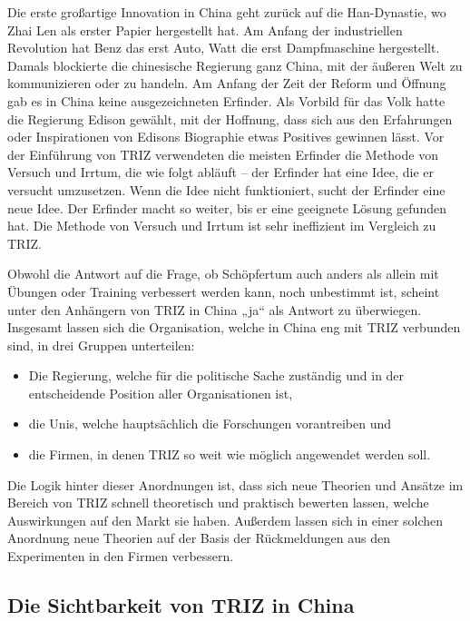 \documentclass[11pt,a4paper]{article}
\begin{document}
Die erste großartige Innovation in China geht zurück auf die Han-Dynastie, wo
Zhai Len als erster Papier hergestellt hat. Am Anfang der industriellen
Revolution hat Benz das erst Auto, Watt die erst Dampfmaschine hergestellt.
Damals blockierte die chinesische Regierung ganz China, mit der äußeren Welt
zu kommunizieren oder zu handeln. Am Anfang der Zeit der Reform und Öffnung
gab es in China keine ausgezeichneten Erfinder. Als Vorbild für das Volk hatte
die Regierung Edison gewählt, mit der Hoffnung, dass sich aus den Erfahrungen
oder Inspirationen von Edisons Biographie etwas Positives gewinnen lässt. Vor
der Einführung von TRIZ verwendeten die meisten Erfinder die Methode von
Versuch und Irrtum, die wie folgt abläuft -- der Erfinder hat eine Idee, die
er versucht umzusetzen. Wenn die Idee nicht funktioniert, sucht der Erfinder
eine neue Idee. Der Erfinder macht so weiter, bis er eine geeignete Lösung
gefunden hat. Die Methode von Versuch und Irrtum ist sehr ineffizient im
Vergleich zu TRIZ.

Obwohl die Antwort auf die Frage, ob Schöpfertum auch anders als allein mit
Übungen oder Training verbessert werden kann, noch unbestimmt ist, scheint
unter den Anhängern von TRIZ in China „ja“ als Antwort zu überwiegen.
Insgesamt lassen sich die Organisation, welche in China eng mit TRIZ verbunden
sind, in drei Gruppen unterteilen: 
\begin{itemize}
\item Die Regierung, welche für die politische Sache zuständig und in der
  entscheidende Position aller Organisationen ist,
\item die Unis, welche hauptsächlich die Forschungen vorantreiben und
\item die Firmen, in denen TRIZ so weit wie möglich angewendet werden soll.
\end{itemize}
Die Logik hinter dieser Anordnungen ist, dass sich neue Theorien und Ansätze
im Bereich von TRIZ schnell theoretisch und praktisch bewerten lassen, welche
Auswirkungen auf den Markt sie haben. Außerdem lassen sich in einer solchen
Anordnung neue Theorien auf der Basis der Rückmeldungen aus den Experimenten
in den Firmen verbessern.

\subsection{Die Sichtbarkeit von TRIZ in China}
\end{document}
